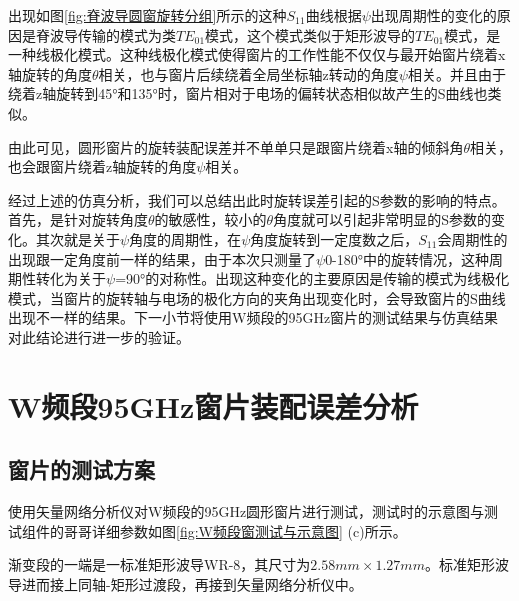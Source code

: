 \documentclass[master]{thesis-uestc}
\begin{document}
出现如图\ref{fig:脊波导圆窗旋转分组}所示的这种$S_{11}$曲线根据$\psi$出现周期性的变化的原因是脊波导传输的模式为类$TE_{01}$模式，这个模式类似于矩形波导的$TE_{01}$模式，是一种线极化模式。这种线极化模式使得窗片的工作性能不仅仅与最开始窗片绕着x轴旋转的角度$\theta$相关，也与窗片后续绕着全局坐标轴z转动的角度$\psi$相关。并且由于绕着z轴旋转到45°和135°时，窗片相对于电场的偏转状态相似故产生的S曲线也类似。

由此可见，圆形窗片的旋转装配误差并不单单只是跟窗片绕着x轴的倾斜角$\theta$相关，也会跟窗片绕着z轴旋转的角度$\psi$相关。

经过上述的仿真分析，我们可以总结出此时旋转误差引起的S参数的影响的特点。首先，是针对旋转角度\(\theta\)的敏感性，较小的\(\theta\)角度就可以引起非常明显的S参数的变化。其次就是关于\(\psi\)角度的周期性，在\(\psi\)角度旋转到一定度数之后，\(S_{11}\)会周期性的出现跟一定角度前一样的结果，由于本次只测量了\(\psi\)0-180°中的旋转情况，这种周期性转化为关于\(\psi\)=90°的对称性。出现这种变化的主要原因是传输的模式为线极化模式，当窗片的旋转轴与电场的极化方向的夹角出现变化时，会导致窗片的S曲线出现不一样的结果。下一小节将使用W频段的95GHz窗片的测试结果与仿真结果对此结论进行进一步的验证。

\section{W频段95GHz窗片装配误差分析}
\subsection{窗片的测试方案}
使用矢量网络分析仪对W频段的95GHz圆形窗片进行测试，测试时的示意图与测试组件的哥哥详细参数如图\ref{fig:W频段窗测试与示意图} (c)所示。

渐变段的一端是一标准矩形波导WR-8，其尺寸为$2.58mm \times 1.27mm$。标准矩形波导进而接上同轴-矩形过渡段，再接到矢量网络分析仪中。
\end{document}
